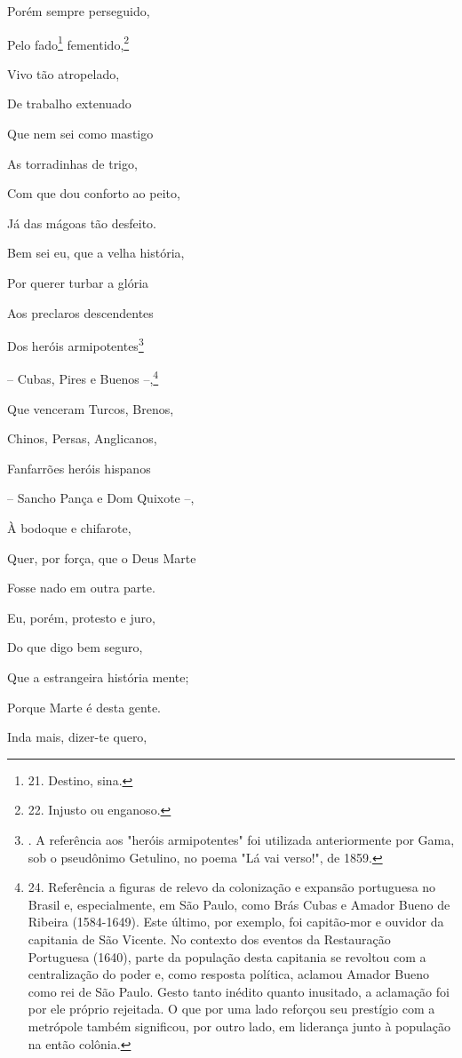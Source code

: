 Porém sempre perseguido,

Pelo fado\footnote{21. Destino, sina.} fementido,\footnote{22. Injusto
  ou enganoso.}

Vivo tão atropelado,

De trabalho extenuado

Que nem sei como mastigo

As torradinhas de trigo,

Com que dou conforto ao peito,

Já das mágoas tão desfeito.

Bem sei eu, que a velha história,

Por querer turbar a glória

Aos preclaros descendentes

Dos heróis armipotentes\footnote{. A referência aos "heróis
  armipotentes" foi utilizada anteriormente por Gama, sob o pseudônimo
  Getulino, no poema "Lá vai verso!", de 1859.}

-- Cubas, Pires e Buenos --,\footnote{24. Referência a figuras de relevo
  da colonização e expansão portuguesa no Brasil e, especialmente, em
  São Paulo, como Brás Cubas e Amador Bueno de Ribeira (1584-1649). Este
  último, por exemplo, foi capitão-mor e ouvidor da capitania de São
  Vicente. No contexto dos eventos da Restauração Portuguesa (1640),
  parte da população desta capitania se revoltou com a centralização do
  poder e, como resposta política, aclamou Amador Bueno como rei de São
  Paulo. Gesto tanto inédito quanto inusitado, a aclamação foi por ele
  próprio rejeitada. O que por uma lado reforçou seu prestígio com a
  metrópole também significou, por outro lado, em liderança junto à
  população na então colônia.}

Que venceram Turcos, Brenos,

Chinos, Persas, Anglicanos,

Fanfarrões heróis hispanos

-- Sancho Pança e Dom Quixote --,

À bodoque e chifarote,

Quer, por força, que o Deus Marte

Fosse nado em outra parte.

Eu, porém, protesto e juro,

Do que digo bem seguro,

Que a estrangeira história mente;

Porque Marte é desta gente.

Inda mais, dizer-te quero,

